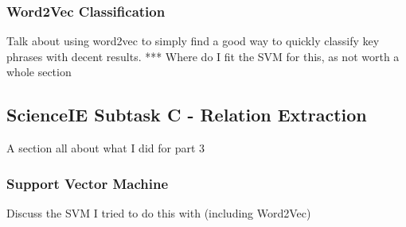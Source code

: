 \subsubsection{Word2Vec Classification}
Talk about using word2vec to simply find a good way to quickly classify key phrases with decent results.
*** Where do I fit the SVM for this, as not worth a whole section

\subsection{ScienceIE Subtask C - Relation Extraction}
A section all about what I did for part 3
\subsubsection{Support Vector Machine}
Discuss the SVM I tried to do this with (including Word2Vec)
